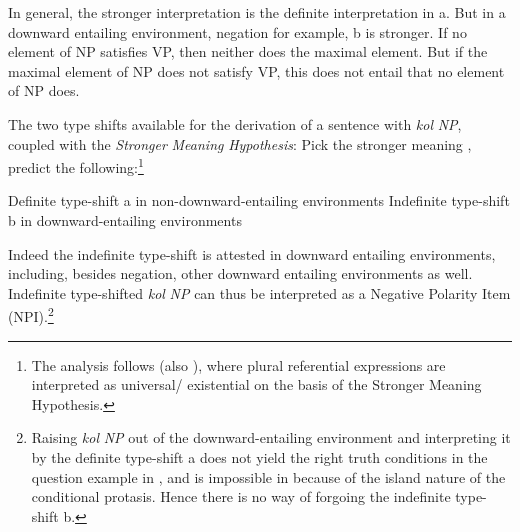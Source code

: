 \documentclass[output=paper]{langsci/langscibook}
\begin{document}
In general, the stronger interpretation is the definite interpretation in a. But in a downward entailing environment, negation for example, b is stronger. If no element of NP satisfies VP, then neither does the maximal element. But if the maximal element of NP does not satisfy VP, this does not entail that no element of NP does.

The two type shifts available for the derivation of a sentence with \textit{kol} \textit{NP}, coupled with the \textit{Stronger} \textit{Meaning} \textit{Hypothesis}: Pick the stronger meaning \citep{DalrympleEtAl1994}, predict the following:\footnote{\textrm{The analysis follows \citet{Krifka1996} (also \citealt{Malamud:2012,Spector2018}), where plural referential expressions are interpreted as universal/ existential on the basis of the Stronger Meaning Hypothesis.} }

\ea%
    \label{ex:doron:34}
\ea Definite type-shift  a in non-downward-entailing environments
\ex Indefinite type-shift  b in downward-entailing environments
\z
\z


Indeed the indefinite type-shift is attested in downward entailing environments, including, besides negation, other downward entailing environments as well. Indefinite type-shifted \textit{kol} \textit{NP} can thus be interpreted as a Negative Polarity Item (NPI).\footnote{Raising \textit{kol} \textit{NP} out of the downward-entailing environment and interpreting it by the definite type-shift a does not yield the right truth conditions in the question example in , and is impossible in  because of the island nature of the conditional protasis. Hence there is no way of forgoing the indefinite type-shift b.}
\end{document}
